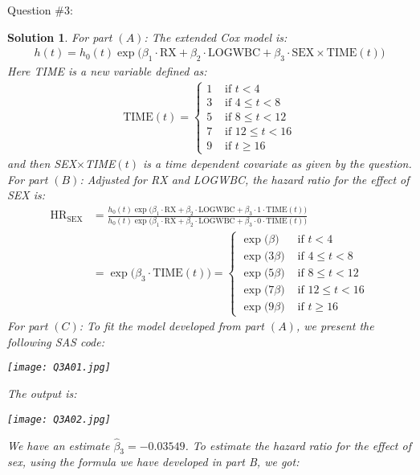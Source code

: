\documentclass[11pt]{article}
\newtheorem{sol}{Solution}
\begin{document}
Question $\#3$:
\begin{sol}
	For part $(A)$:\vskip 2mm
	The extended Cox model is:
	\begin{align*}
		h(t) = h_0(t)\exp\Big(\beta_1 \cdot \text{RX} + \beta_2\cdot \text{LOGWBC} + \beta_3\cdot \text{SEX}\times\text{TIME}(t)\Big)
	\end{align*}	
	Here TIME is a new variable defined as:
	\begin{align*}
		\text{TIME}(t) = \left\{\begin{array}{ll} 1& \text{ if } t < 4 \\ 3& \text{ if } 4 \leq t < 8\\ 5& \text{ if }8 \leq t < 12\\ 7& \text{ if }12 \leq t < 16\\ 9& \text{ if }t \geq 16\end{array}\right.
	\end{align*}
	and then SEX$\times$TIME$(t)$ is a time dependent covariate as given by the question.\vskip 2mm
	For part $(B)$:\vskip 2mm
	Adjusted for RX and LOGWBC, the hazard ratio for the effect of SEX is:
	\begin{align*}
		\text{HR}_{\text{SEX}} &= \frac{h_0(t)\exp\Big(\beta_1\cdot\text{RX} + \beta_2\cdot\text{LOGWBC}+ \beta_3\cdot 1 \cdot \text{TIME}(t)\Big)}{h_0(t)\exp\Big(\beta_1\cdot\text{RX} + \beta_2\cdot\text{LOGWBC} + \beta_3\cdot 0 \cdot \text{TIME}(t)\Big)}\\
		&= \exp\Big(\beta_3\cdot \text{TIME}(t)\Big) = \left\{\begin{array}{ll} \exp\Big(\beta\Big)& \text{ if } t < 4\\ \exp\Big(3\beta\Big)& \text{ if } 4 \leq t < 8\\ \exp\Big(5\beta\Big) &\text{ if }8 \leq t < 12 \\ \exp\Big(7\beta)& \text{ if }12 \leq t < 16\\ \exp\Big(9\beta\Big)&  \text{ if }t \geq 16\end{array}\right.
	\end{align*}
	For part $(C)$:\vskip 2mm
	To fit the model developed from part $(A)$, we present the following SAS code:
	\begin{center}
		\texttt{[image: Q3A01.jpg]}
	\end{center}
	The output is:
	\begin{center}
		\texttt{[image: Q3A02.jpg]}
	\end{center}
	We have an estimate $\hat{\beta}_3 =-0.03549$. To estimate the hazard ratio for the effect of sex, using the formula we have developed in part B, we got:

\end{sol}
\end{document}

